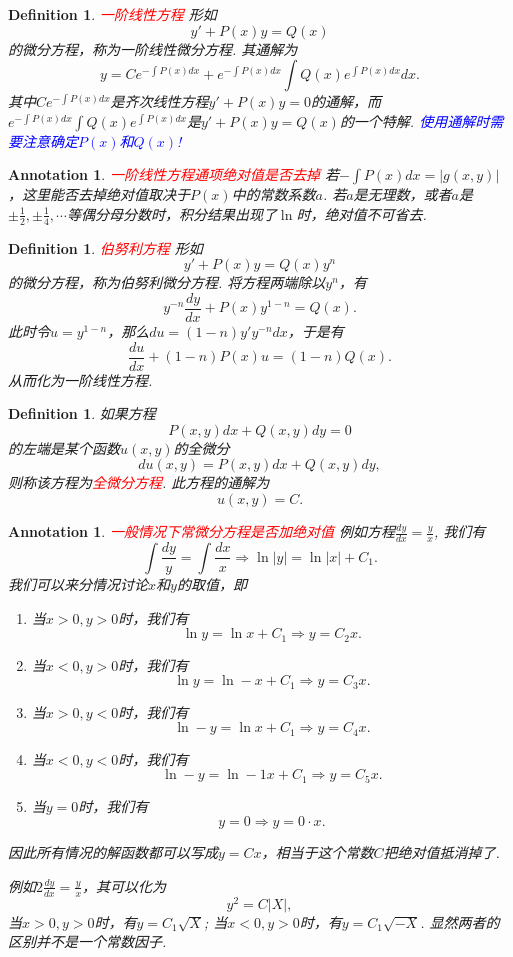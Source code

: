 \documentclass{article}
\newtheorem{definition}[theorem]{Definition}
\newtheorem{annotation}[theorem]{Annotation}
\newcommand{\redt}[1]{\textcolor{red}{#1}}
\newcommand{\bluet}[1]{\textcolor{blue}{#1}}
\begin{document}
\begin{definition}
\rm \redt{一阶线性方程} 形如
$$
y'+P(x)y = Q(x)
$$
的微分方程，称为一阶线性微分方程. 其通解为
$$
y= Ce^{-\int P(x)dx } + e^{-\int P(x)dx }\int Q(x)e^{\int P(x)dx}dx. 
$$
其中$Ce^{-\int P(x)dx }$是齐次线性方程$y'+P(x)y=0$的通解，而$e^{-\int P(x)dx }\int Q(x)e^{\int P(x)dx}$是$y'+P(x)y=Q(x)$的一个特解. \bluet{使用通解时需要注意确定$P(x)$和$Q(x)$!}
\end{definition}


\begin{annotation}
\rm \redt{一阶线性方程通项绝对值是否去掉} 若$-\int P(x)dx = |g(x,y)|$，这里能否去掉绝对值取决于$P(x)$中的常数系数$a$. 若$a$是无理数，或者$a$是$\pm \frac{1}{2},\pm \frac{1}{4},\cdots$等偶分母分数时，积分结果出现了$\ln$时，绝对值不可省去.  
\end{annotation}

\begin{definition}
\rm \redt{伯努利方程} 形如
$$
y' +P(x)y=Q(x)y^n
$$
的微分方程，称为伯努利微分方程. 将方程两端除以$y^n$，有
$$
y^{-n} \frac{dy}{dx} + P(x)y^{1-n} = Q(x).
$$
此时令$u = y^{1-n}$，那么$du = (1-n)y'y^{-n}dx$，于是有
$$
\frac{du}{dx} + (1-n)P(x)u = (1-n)Q(x).
$$
从而化为一阶线性方程. 
\end{definition}

\begin{definition}
\rm 如果方程
$$
P(x,y)dx + Q(x,y)dy = 0
$$
的左端是某个函数$u(x,y)$的全微分
$$
du(x,y) = P(x,y)dx + Q(x,y)dy,
$$
则称该方程为\redt{全微分方程}. 此方程的通解为
$$
u(x,y) = C. 
$$
\end{definition}

\begin{annotation}
\rm \redt{一般情况下常微分方程是否加绝对值} 例如方程$\frac{dy}{dx} = \frac{y}{x}$, 我们有
$$
\int \frac{dy}{y} = \int \frac{dx}{x} \Rightarrow \ln |y| = \ln |x| + C_1. 
$$
我们可以来分情况讨论$x$和$y$的取值，即
\begin{enumerate}
	\item 当$x > 0, y > 0$时，我们有
	$$
	\ln y = \ln x + C_1 \Rightarrow y = C_2 x.
	$$
	\item 当$x < 0, y > 0$时，我们有
	$$
	\ln y = \ln -x + C_1 \Rightarrow y = C_3 x.
	$$
	\item 当$x > 0 , y < 0$时，我们有
	$$
	\ln -y = \ln x + C_1 \Rightarrow y= C_4 x.
	$$
	\item 当$x < 0, y < 0$时，我们有
	$$
	\ln -y = \ln -1x + C_1 \Rightarrow y = C_5 x.
	$$
	\item 当$y = 0$时，我们有
	$$
	y = 0 \Rightarrow y = 0 \cdot x.
	$$
\end{enumerate}
因此所有情况的解函数都可以写成$y = Cx$，相当于这个常数$C$把绝对值抵消掉了. 

例如$2\frac{dy}{dx} = \frac{y}{x}$，其可以化为
$$
y^2 = C|X|,
$$
当$x > 0, y > 0$时，有$y = C_1\sqrt{X}$; 当$x < 0, y >0$时，有$y=C_1\sqrt{-X}$. 显然两者的区别并不是一个常数因子. 
\end{annotation}
\end{document}
